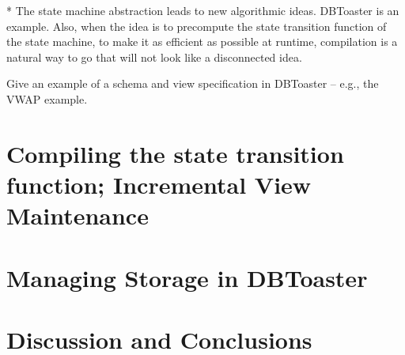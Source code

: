 \documentclass{sig-alternate}
\begin{document}
* The state machine abstraction leads to new algorithmic ideas. DBToaster is an example. Also, when the idea is to precompute the state transition function of the state machine, to make it as efficient as possible at runtime, compilation is a natural way to go that will not look like a disconnected idea.




Give an example of a schema and view specification in DBToaster -- e.g., the VWAP example.





\section{Compiling the state transition function; Incremental View Maintenance}




\section{Managing Storage in DBToaster}



\section{Discussion and Conclusions}
\end{document}
